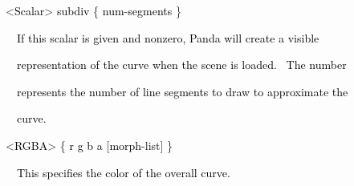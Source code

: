 \documentclass[a4paper]{article}
\newcommand\textstyleOOoComputerKeyWord[1]{\textrm{\textcolor[rgb]{0.0,0.0,0.5019608}{#1}}}
\newcommand\textstyleOOoAssemblerSpecialChar[1]{\textrm{\textcolor[rgb]{0.0,0.5019608,0.0}{#1}}}
\newcommand\textstyleOOoAssemblerIdent[1]{\textrm{\textcolor{black}{#1}}}
\newcommand\textstyleOOoAssemblerDirective[1]{\textrm{\textcolor[rgb]{0.0,0.5019608,1.0}{#1}}}
\begin{document}
\bigskip

{\color{black}
\textstyleOOoComputerKeyWord{\textcolor{black}{\ \ }}\textstyleOOoAssemblerSpecialChar{{\textless}}\textstyleOOoAssemblerIdent{Scalar}\textstyleOOoAssemblerSpecialChar{{\textgreater}}\textstyleOOoComputerKeyWord{\textcolor{black}{
}}\textstyleOOoAssemblerIdent{subdiv}\textstyleOOoComputerKeyWord{\textcolor{black}{
}}\textstyleOOoAssemblerSpecialChar{\{}\textstyleOOoComputerKeyWord{\textcolor{black}{
}}\textstyleOOoAssemblerIdent{num}\textstyleOOoAssemblerSpecialChar{{}-}\textstyleOOoAssemblerIdent{segments}\textstyleOOoComputerKeyWord{\textcolor{black}{
}}\textstyleOOoAssemblerSpecialChar{\}}}


\bigskip

{\color{black}
\textstyleOOoComputerKeyWord{\textcolor{black}{\ \ \ \ If this scalar is given and nonzero, Panda will create a
visible}}}

{\color{black}
\textstyleOOoComputerKeyWord{\textcolor{black}{\ \ \ \ representation of the curve when the scene is loaded. \ The
number}}}

{\color{black}
\textstyleOOoComputerKeyWord{\textcolor{black}{\ \ \ \ represents the number of line segments to draw to approximate
the}}}

{\color{black}
\textstyleOOoComputerKeyWord{\textcolor{black}{\ \ \ \ curve.}}}


\bigskip

{\color{black}
\textstyleOOoComputerKeyWord{\textcolor{black}{\ \ }}\textstyleOOoAssemblerSpecialChar{{\textless}}\textstyleOOoAssemblerIdent{RGBA}\textstyleOOoAssemblerSpecialChar{{\textgreater}}\textstyleOOoComputerKeyWord{\textcolor{black}{
}}\textstyleOOoAssemblerSpecialChar{\{}\textstyleOOoComputerKeyWord{\textcolor{black}{
}}\textstyleOOoAssemblerIdent{r}\textstyleOOoComputerKeyWord{\textcolor{black}{
}}\textstyleOOoAssemblerIdent{g}\textstyleOOoComputerKeyWord{\textcolor{black}{
}}\textstyleOOoAssemblerIdent{b}\textstyleOOoComputerKeyWord{\textcolor{black}{
}}\textstyleOOoAssemblerIdent{a}\textstyleOOoComputerKeyWord{\textcolor{black}{
}}\textstyleOOoAssemblerSpecialChar{[}\textstyleOOoAssemblerIdent{morph}\textstyleOOoAssemblerSpecialChar{{}-}\textstyleOOoAssemblerDirective{list}\textstyleOOoAssemblerSpecialChar{]}\textstyleOOoComputerKeyWord{\textcolor{black}{
}}\textstyleOOoAssemblerSpecialChar{\}}}


\bigskip

{\color{black}
\textstyleOOoComputerKeyWord{\textcolor{black}{\ \ \ \ This specifies the color of the overall curve.}}}
\end{document}
